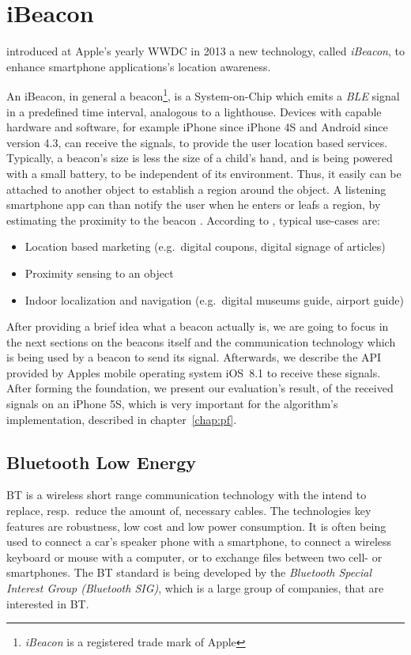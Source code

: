 \chapter{iBeacon} \label{chap:ibeacons}
\citet{apple:wwdc_2013_bruins} introduced at Apple's yearly \ac{WWDC} in 2013 a new technology, called \emph{iBeacon}, to enhance smartphone applications's location awareness.

An iBeacon, in general a beacon\footnote{\emph{iBeacon} is a registered trade mark of Apple}, is a System-on-Chip which emits a \emph{\acl{BLE}} signal in a predefined time interval, analogous to a lighthouse. Devices with capable hardware and software, for example iPhone since iPhone 4S and Android since version 4.3, can receive the signals, to provide the user location based services. Typically, a beacon's size is less the size of a child's hand, and is being powered with a small battery, to be independent of its environment. Thus, it easily can be attached to another object to establish a region around the object. A listening smartphone app can than notify the user when he enters or leafs a region, by estimating the proximity to the beacon \citep{apple:getting_started,binside:ds}. According to \citet{binside:ds}, typical use-cases are:
\begin{itemize}
  \item Location based marketing (e.g.\ digital coupons, digital signage of articles)
  \item Proximity sensing to an object
  \item Indoor localization and navigation (e.g.\ digital museums guide, airport guide)
\end{itemize}

After providing a brief idea what a beacon actually is, we are going to focus in the next sections on the beacons itself and the communication technology which is being used by a beacon to send its signal. Afterwards, we describe the \acs{API} provided by Apples mobile operating system iOS~8.1 to receive these signals. After forming the foundation, we present our evaluation's result, of the received signals on an iPhone 5S, which is very important for the algorithm's implementation, described in chapter~\ref{chap:pf}.


\section{Bluetooth Low Energy}\label{sec:ble}
\ac{BT} is a wireless short range communication technology with the intend to replace, resp.\ reduce the amount of, necessary cables. The technologies key features are robustness, low cost and low power consumption. It is often being used to connect a car's speaker phone with a smartphone, to connect a wireless keyboard or mouse with a computer, or to exchange files between two cell- or smartphones. The \acl{BT} standard is being developed by the \emph{Bluetooth Special Interest Group (Bluetooth SIG)}, which is a large group of companies, that are interested in \acs{BT}.

